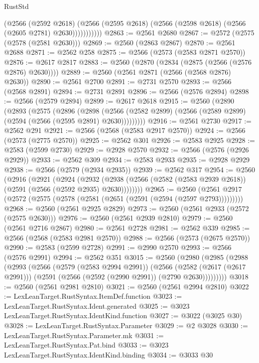 \begin{lexlean}{RustStd}
\begin{coremodule}
                  (@2566
                    (@2592 @2618)
                    (@2566 (@2595 @2618) (@2566 (@2598 @2618) (@2566 (@2605 @2781) @2630)))))))))))
@2863 := @2561 @2680
@2867 := @2572 (@2575 (@2578 (@2581 @2630)))
@2869 := @2560 (@2863 @2867)
@2870 := @2561 @2688
@2871 := @2562 @258
@2875 := @2566 (@2573 (@2583 @2871 @2570))
@2876 := @2617 @2817
@2883 := @2560 (@2870 (@2834 (@2875 (@2566 (@2576 @2876) @2630))))
@2889 := @2560 (@2561 @2871 (@2566 (@2568 @2876) @2630))
@2890 := @2561 @2700
@2891 := @2731 @2570
@2893 := @2566 (@2568 @2891)
@2894 := @2731 @2891
@2896 := @2566 (@2576 @2894)
@2898 := @2566 (@2579 @2894)
@2899 := @2617 @2618
@2915 := @2560
    (@2890
      (@2893
        (@2575
          (@2896
            (@2898
              (@2566 (@2582 @2899) (@2566 (@2589 @2899) (@2594 (@2566 (@2595 @2891) @2630)))))))))
@2916 := @2561 @2730
@2917 := @2562 @291
@2921 := @2566 (@2568 (@2583 @2917 @2570))
@2924 := @2566 (@2573 (@2775 @2570))
@2925 := @2562 @301
@2926 := @2583 @2925
@2928 := @2583 (@2599 @2730)
@2929 := @2928 @2570
@2932 := @2566 (@2576 (@2926 @2929))
@2933 := @2562 @309
@2934 := @2583 @2933
@2935 := @2928 @2929
@2938 := @2566 (@2579 (@2934 @2935))
@2939 := @2562 @317
@2954 := @2560
    (@2916
      (@2921
        (@2924
          (@2932 (@2938 (@2566 (@2582 (@2583 @2939 @2618)) (@2591 (@2566 (@2592 @2935) @2630))))))))
@2965 := @2560 (@2561 @2917 (@2572 (@2575 (@2578 (@2581 (@2651 (@2591 (@2594 (@2597 @2793)))))))))
@2968 := @2560 (@2561 @2925 @2829)
@2973 := @2560 (@2561 @2933 (@2572 (@2575 @2630)))
@2976 := @2560 (@2561 @2939 @2810)
@2979 := @2560 (@2561 @2716 @2867)
@2980 := @2561 @2728
@2981 := @2562 @339
@2985 := @2566 (@2568 (@2583 @2981 @2570))
@2988 := @2566 (@2573 (@2675 @2570))
@2990 := @2583 (@2599 @2728)
@2991 := @2990 @2570
@2993 := @2566 (@2576 @2991)
@2994 := @2562 @351
@3015 := @2560
    (@2980
      (@2985
        (@2988
          (@2993
            (@2566
              (@2579 (@2583 @2994 @2991))
              (@2566
                (@2582 (@2617 (@2617 @2991)))
                (@2591 (@2566 (@2592 (@2990 @2991)) (@2790 @2630)))))))))
@3018 := @2560 (@2561 @2981 @2810)
@3021 := @2560 (@2561 @2994 @2810)
@3022 := LexLeanTarget.RustSyntax.ItemDef.function
@3023 := LexLeanTarget.RustSyntax.Ident.generated
@3025 := @3023 LexLeanTarget.RustSyntax.IdentKind.function
@3027 := @3022 (@3025 @30)
@3028 := LexLeanTarget.RustSyntax.Parameter
@3029 := @2 @3028
@3030 := LexLeanTarget.RustSyntax.Parameter.mk
@3031 := LexLeanTarget.RustSyntax.Pat.bind
@3033 := @3023 LexLeanTarget.RustSyntax.IdentKind.binding
@3034 := @3033 @30

\end{coremodule}
\end{lexlean}
